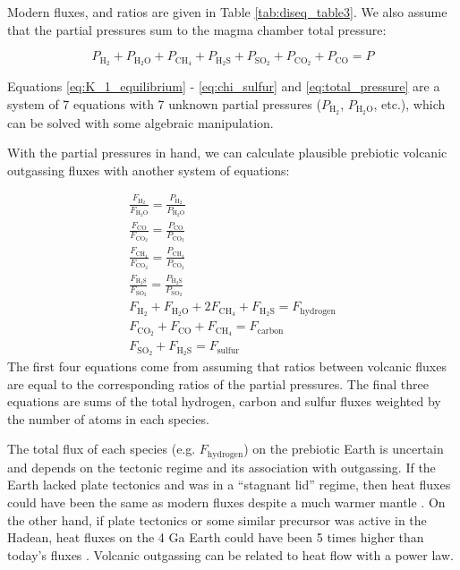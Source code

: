 Modern fluxes, and ratios are given in Table \ref{tab:diseq_table3}. We also assume that the partial pressures sum to the magma chamber total pressure:

\begin{equation}
  \label{eq:total_pressure}
  P_\mathrm{H_2} + P_\mathrm{H_2O} + P_\mathrm{CH_4} + P_\mathrm{H_2S} + P_\mathrm{SO_2} + P_\mathrm{CO_2} + P_\mathrm{CO} = P 
\end{equation}

Equations \eqref{eq:K_1_equilibrium} - \eqref{eq:chi_sulfur} and \eqref{eq:total_pressure} are a system of 7 equations with 7 unknown partial pressures ($P_\mathrm{H_2}$, $P_\mathrm{H_2O}$, etc.), which can be solved with some algebraic manipulation.

With the partial pressures in hand, we can calculate plausible prebiotic volcanic outgassing fluxes with another system of equations: 

\begin{gather}
  \frac{F_\mathrm{H_2}}{F_\mathrm{H_2O}} = \frac{P_\mathrm{H_2}}{P_\mathrm{H_2O}} \label{eq:flux_ratios} \\
  \frac{F_\mathrm{CO}}{F_\mathrm{CO_2}} = \frac{P_\mathrm{CO}}{P_\mathrm{CO_2}} \\
  \frac{F_\mathrm{CH_4}}{F_\mathrm{CO_2}} = \frac{P_\mathrm{CH_4}}{P_\mathrm{CO_2}} \\
  \frac{F_\mathrm{H_2S}}{F_\mathrm{SO_2}} = \frac{P_\mathrm{H_2S}}{P_\mathrm{SO_2}} \\
  F_\mathrm{H_2} + F_\mathrm{H_2O} + 2 F_\mathrm{CH_4} + F_\mathrm{H_2S} = F_\mathrm{hydrogen} \\
  F_\mathrm{CO_2} + F_\mathrm{CO} + F_\mathrm{CH_4} = F_\mathrm{carbon} \\
  F_\mathrm{SO_2} + F_\mathrm{H_2S} = F_\mathrm{sulfur} \label{eq:total_sulfur_flux}
\end{gather}
The first four equations come from assuming that ratios between volcanic fluxes are equal to the corresponding ratios of the partial pressures. The final three equations are sums of the total hydrogen, carbon and sulfur fluxes weighted by the number of atoms in each species. 

The total flux of each species (e.g. $F_\mathrm{hydrogen}$) on the prebiotic Earth is uncertain and depends on the tectonic regime and its association with outgassing. If the Earth lacked plate tectonics and was in a ``stagnant lid'' regime, then heat fluxes could have been the same as modern fluxes despite a much warmer mantle \citep{Korenaga_2009}. On the other hand, if plate tectonics or some similar precursor was active in the Hadean, heat fluxes on the 4 Ga Earth could have been 5 times higher than today's fluxes \citep{Sleep_2001}. Volcanic outgassing can be related to heat flow with a power law.

